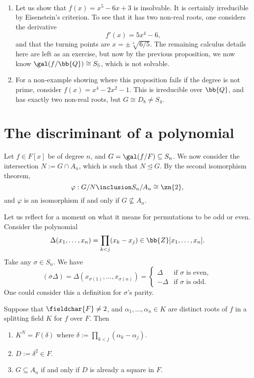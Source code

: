 \begin{exercise}~
    \begin{enumerate}
        \item Let us show that $f(x) = x^5 - 6x + 3$ is insolvable. It is certainly irreducible by Eisenstein's criterion. To see that it has two non-real roots, one considers the derivative
        \[
            f'(x) = 5x^4 - 6,
        \]
        and that the turning points are $x = \pm \sqrt[4]{6/5}$. The remaining calculus details here are left as an exercise, but now by the previous proposition, we now know $\gal(f/\bb{Q}) \cong S_5$, which is not solvable.
        
        \item For a non-example showing where this proposition fails if the degree is not prime, consider $f(x) = x^4 - 2x^2 - 1$. This is irreducible over $\bb{Q}$, and has exactly two non-real roots, but $G \cong D_8 \neq S_4$.
    \end{enumerate}
\end{exercise}

\section{The discriminant of a polynomial}

Let $f \in F[x]$ be of degree $n$, and $G = \gal(f/F) \subseteq S_n$. We now consider the intersection $N := G \cap A_n$, which is such that $N \unlhd G$. By the second isomorphism theorem,
\[
    \varphi: G/N \inclusion S_n/A_n \cong \zn{2},
\]
and $\varphi$ is an isomorphism if and only if $G \not\subseteq A_n$.

Let us reflect for a moment on what it means for permutations to be odd or even. Consider the polynomial
\[
    \Delta(x_1, \ldots, x_n) = \prod_{k < j} (x_k - x_j) \in \bb{Z}[x_1, \ldots, x_n].
\]
Take any $\sigma \in S_n$. We have
\[
    (\sigma \Delta) = \Delta(x_{\sigma(1)}, \ldots, x_{\sigma(n)}) = \begin{cases}
        \Delta & \text{if } \sigma \text{ is even}, \\
        -\Delta & \text{if } \sigma \text{ is odd}.
    \end{cases}
\]
One could consider this a definition for $\sigma$'s parity.

\begin{proposition}
    Suppose that $\fieldchar{F} \neq 2$, and $\alpha_1, \ldots, \alpha_n \in K$ are distinct roots of $f$ in a splitting field $K$ for $f$ over $F$. Then
    \begin{enumerate}[label=(\alph*)]
        \item $K^N = F(\delta)$ where $\delta := \prod_{k < j} (\alpha_k - \alpha_j)$.
        \item $D := \delta^2 \in F$.
        \item $G \subseteq A_n$ if and only if $D$ is already a square in $F$.
    \end{enumerate}
\end{proposition}

